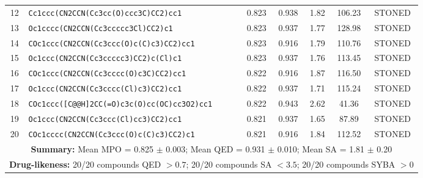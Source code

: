 \documentclass[journal=jcisd8,manuscript=suppinfo]{achemso}
\begin{document}
\begin{table}[!htbp]
\begin{tabular}{@{}c p{8.25cm} c c c c c@{}}
\num{12} & \texttt{Cc1ccc(CN2CCN(Cc3cc(O)ccc3C)CC2)cc1} & \num{0.823} & \num{0.938} & \num{1.82} & \num{106.23} & STONED \\
\num{13} & \texttt{Oc1cccc(CN2CCN(Cc3ccccc3Cl)CC2)c1} & \num{0.823} & \num{0.937} & \num{1.77} & \num{128.98} & STONED \\
\num{14} & \texttt{COc1ccc(CN2CCN(Cc3ccc(O)c(C)c3)CC2)cc1} & \num{0.823} & \num{0.916} & \num{1.79} & \num{110.76} & STONED \\
\num{15} & \texttt{Oc1ccc(CN2CCN(Cc3ccccc3)CC2)c(Cl)c1} & \num{0.823} & \num{0.937} & \num{1.76} & \num{113.45} & STONED \\
\num{16} & \texttt{COc1ccc(CN2CCN(Cc3cccc(O)c3C)CC2)cc1} & \num{0.822} & \num{0.916} & \num{1.87} & \num{116.50} & STONED \\
\num{17} & \texttt{Oc1ccc(CN2CCN(Cc3cccc(Cl)c3)CC2)cc1} & \num{0.822} & \num{0.937} & \num{1.71} & \num{115.24} & STONED \\
\num{18} & \texttt{COc1ccc([C@@H]2CC(=O)c3c(O)cc(OC)cc3O2)cc1} & \num{0.822} & \num{0.943} & \num{2.62} & \num{41.36} & STONED \\
\num{19} & \texttt{Oc1ccc(CN2CCN(Cc3ccc(Cl)cc3)CC2)cc1} & \num{0.821} & \num{0.937} & \num{1.65} & \num{87.89} & STONED \\
\num{20} & \texttt{COc1cccc(CN2CCN(Cc3ccc(O)c(C)c3)CC2)c1} & \num{0.821} & \num{0.916} & \num{1.84} & \num{112.52} & STONED \\
\midrule
\multicolumn{7}{p{17cm}}{\textbf{Summary:} Mean MPO = \num{0.825} $\pm$ \num{0.003}; Mean QED = \num{0.931} $\pm$ \num{0.010}; Mean SA = \num{1.81} $\pm$ \num{0.20}} \\
\multicolumn{7}{p{17cm}}{\textbf{Drug-likeness:} \num{20}/\num{20} compounds QED $> \num{0.7}$; \num{20}/\num{20} compounds SA $< \num{3.5}$; \num{20}/\num{20} compounds SYBA $> \num{0}$} \\
\bottomrule
\end{tabular}
\end{table}
\end{document}
